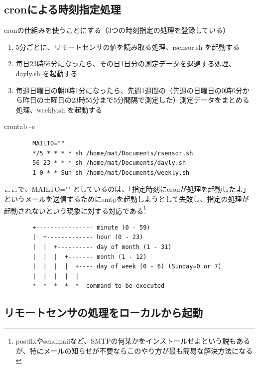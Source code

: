 \documentclass[12pt,a4paper,uplatex]{jsarticle}
\begin{document}

\subsection{cronによる時刻指定処理}

cronの仕組みを使うことにする（3つの時刻指定の処理を登録している）
\begin{enumerate}
	\item[(1)] 5分ごとに、リモートセンサの値を読み取る処理、rsensor.sh を起動する
	\item[(2)] 毎日23時56分になったら、その日1日分の測定データを退避する処理、dayly.sh を起動する
	\item[(3)] 毎週日曜日の朝0時1分になったら、先週1週間の（先週の日曜日の0時0分から昨日の土曜日の23時55分まで5分間隔で測定した）測定データをまとめる処理、weekly.sh を起動する
\end{enumerate}

\begin{itembox}[l]{crontab -e}
	\begin{verbatim}
		MAILTO=""
		*/5 * * * * sh /home/mat/Documents/rsensor.sh
		56 23 * * * sh /home/mat/Documents/dayly.sh
		1 0 * * Sun sh /home/mat/Documents/weekly.sh
	\end{verbatim}
\end{itembox}

ここで、MAILTO="" としているのは、「指定時刻にcronが処理を起動したよ」というメールを送信するためにsmtpを起動しようとして失敗し、指定の処理が起動されないという現象に対する対応である\footnote{postfixやsendmailなど、SMTPの何某かをインストールせよという説もあるが、特にメールの知らせが不要ならこのやり方が最も簡易な解決方法になる}

\begin{screen}
	\begin{verbatim}
		+---------------- minute (0 - 59)
		|  +------------- hour (0 - 23)
		|  |  +---------- day of month (1 - 31)
		|  |  |  +------- month (1 - 12)
		|  |  |  |  +---- day of week (0 - 6) (Sunday=0 or 7)
		|  |  |  |  |
		*  *  *  *  *  command to be executed
	\end{verbatim}
\end{screen}

\newpage

\subsection{リモートセンサの処理をローカルから起動}
\end{document}
